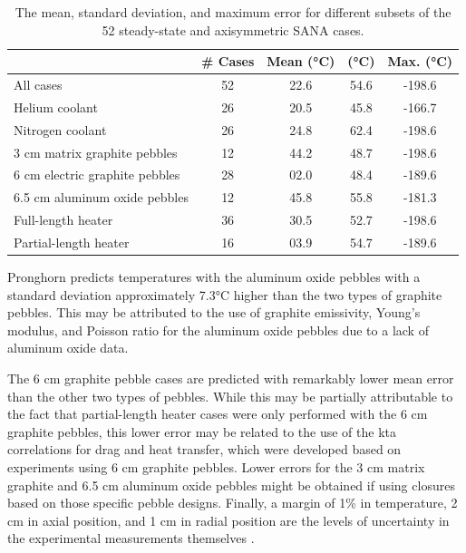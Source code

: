 \begin{table}[h!]
\caption{The mean, standard deviation, and maximum error for different subsets of the 52 steady-state and axisymmetric SANA cases.}
\centering
\begin{tabular}{@{}l c c c c @{}}
\toprule
 & \textbf{\# Cases} & \textbf{Mean (\si{\celsius})} & \textbf{\boldmath{\(\sigma\)} (\si{\celsius})} & \textbf{Max. (\si{\celsius})}\\
\midrule
All cases & 52 & 22.6 & 54.6 & \color{white}-\color{black}198.6\\
Helium coolant & 26 & 20.5 & 45.8 & \color{white}-\color{black}166.7\\
Nitrogen coolant & 26 & 24.8 & 62.4 & \color{white}-\color{black}198.6\\
3 \si{\centi\meter} matrix graphite pebbles & 12 & 44.2 & 48.7 & \color{white}-\color{black}198.6\\
6 \si{\centi\meter} electric graphite pebbles & 28 & \color{white}0\color{black}2.0 & 48.4 & -189.6\\
6.5 \si{\centi\meter} aluminum oxide pebbles & 12 & 45.8 & 55.8 & \color{white}-\color{black}181.3\\
Full-length heater & 36 & 30.5 & 52.7 & \color{white}-\color{black}198.6\\
Partial-length heater & 16 & \color{white}0\color{black}3.9 & 54.7 & -189.6\\
\bottomrule
\end{tabular}
\label{table:subcases}
\end{table}

Pronghorn predicts temperatures with the aluminum oxide pebbles with a standard deviation approximately 7.3\si{\celsius} higher than the two types of graphite pebbles. This may be attributed to the use of graphite emissivity, Young's modulus, and Poisson ratio for the aluminum oxide pebbles due to a lack of aluminum oxide data. 

The 6 \si{\centi\meter} graphite pebble cases are predicted with remarkably lower mean error than the other two types of pebbles. While this may be partially attributable to the fact that partial-length heater cases were only performed with the 6 \si{\centi\meter} graphite pebbles, this lower error may be related to the use of the \gls{kta} correlations for drag and heat transfer, which were developed based on experiments using 6 \si{\centi\meter} graphite pebbles. Lower errors for the 3 \si{\centi\meter} matrix graphite and 6.5 \si{\centi\meter} aluminum oxide pebbles might be obtained if using closures based on those specific pebble designs. Finally, a margin of 1\% in temperature, 2 \si{\centi\meter} in axial position, and 1 \si{\centi\meter} in radial position are the levels of uncertainty in the experimental measurements themselves \cite{becker2003}.

